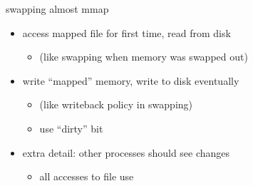 
\begin{frame}{swapping almost mmap}
\begin{itemize}
    \item access mapped file for first time, read from disk
        \begin{itemize}
        \item (like swapping when memory was swapped out)
        \end{itemize}
    \item write ``mapped'' memory, write to disk eventually
        \begin{itemize}
        \item (like writeback policy in swapping)
        \item use ``dirty'' bit
        \end{itemize}
    \vspace{.5cm}
    \item extra detail: other processes should see changes
        \begin{itemize}
        \item all accesses to file use 
        \end{itemize}
\end{itemize}
\end{frame}
